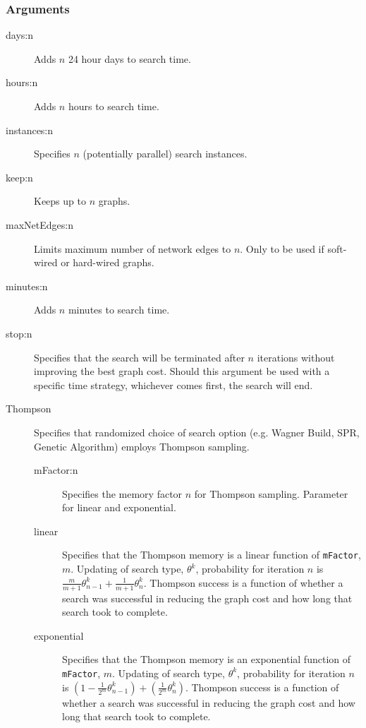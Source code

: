 	\subsubsection{Arguments}
	\begin{description}
		\item[days:n] Adds $n$ 24 hour days to search time.
		
		\item[hours:n] Adds $n$ hours to search time.
		
		\item[instances:n] Specifies $n$ (potentially parallel) search instances.
		
		\item[keep:n] Keeps up to $n$ graphs.
		
		\item[maxNetEdges:n] Limits maximum number of network edges to $n$. Only to be used if
		soft-wired or hard-wired graphs.
		
		\item[minutes:n] Adds $n$ minutes to search time.
		
		
		\item[stop:n] Specifies that the search will be terminated after $n$ iterations without 
		improving the best graph cost. Should this argument be used with a specific time strategy, 
		whichever comes first, the search will end.
		
		\item[Thompson] Specifies that randomized choice of search option (e.g. Wagner 
		Build, SPR, Genetic Algorithm) 
		employs Thompson sampling.
		\begin{description}
				\item[mFactor:n] Specifies the memory factor $n$ for Thompson sampling. Parameter
				for linear and exponential.
		
			\item[linear] Specifies that the Thompson memory is a linear function of \texttt{mFactor}, 
			$m$.  Updating of search type, $\theta^k$, probability for iteration $n$ is $\frac{m}{m+1} 
			\theta^k_{n-1} + \frac{1}{m+1} \theta^k_n$.  Thompson success is a function of whether 
			a search was successful in reducing the graph cost and how long that search took to 
			complete.
		
			\item[exponential] Specifies that the Thompson memory is an exponential function of 
			\texttt{mFactor}, $m$.  Updating of search type, $\theta^k$, probability for iteration 
			$n$ is $ \left(1 - \frac{1}{2^m} \theta^k_{n-1}\right) + \left(\frac{1}{2^m} \theta^k_n \right)$.  
			Thompson success is a function of whether a search was successful in reducing the graph 
			cost and how long that search took to complete.
		\end{description}	

	\end{description}
		
